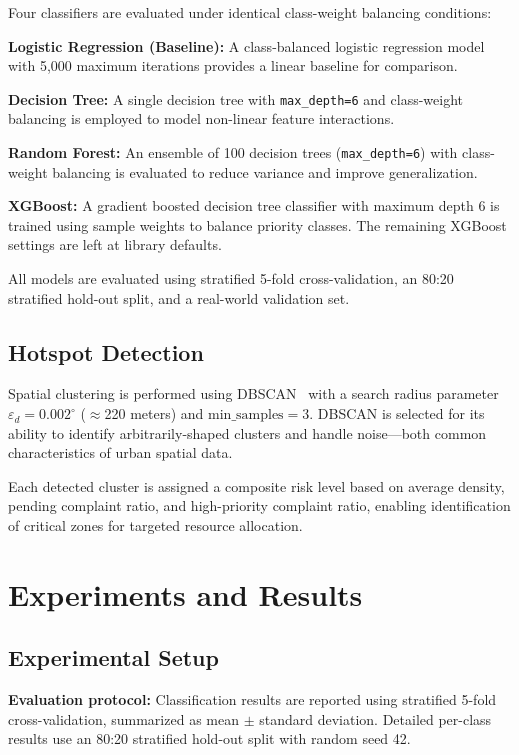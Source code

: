\documentclass[conference]{IEEEtran}
\begin{document}
Four classifiers are evaluated under identical class-weight balancing conditions:

\textbf{Logistic Regression (Baseline):} A class-balanced logistic regression model with 5,000 maximum iterations provides a linear baseline for comparison.

\textbf{Decision Tree:} A single decision tree with \texttt{max\_depth=6} and class-weight balancing is employed to model non-linear feature interactions.

\textbf{Random Forest:} An ensemble of 100 decision trees (\texttt{max\_depth=6}) with class-weight balancing is evaluated to reduce variance and improve generalization.

\textbf{XGBoost:} A gradient boosted decision tree classifier with maximum depth 6 is trained using sample weights to balance priority classes. The remaining XGBoost settings are left at library defaults.

All models are evaluated using stratified 5-fold cross-validation, an 80:20 stratified hold-out split, and a real-world validation set.

\subsection{Hotspot Detection}

Spatial clustering is performed using DBSCAN~\cite{ester1996dbscan} with a search radius parameter $\varepsilon_d = 0.002^{\circ}$ ($\approx$220 meters) and $\text{min\_samples} = 3$. DBSCAN is selected for its ability to identify arbitrarily-shaped clusters and handle noise---both common characteristics of urban spatial data.

Each detected cluster is assigned a composite risk level based on average density, pending complaint ratio, and high-priority complaint ratio, enabling identification of critical zones for targeted resource allocation.

\FloatBarrier
\section{Experiments and Results}

\subsection{Experimental Setup}

\textbf{Evaluation protocol:} Classification results are reported using stratified 5-fold cross-validation, summarized as mean $\pm$ standard deviation. Detailed per-class results use an 80:20 stratified hold-out split with random seed 42.
\end{document}
